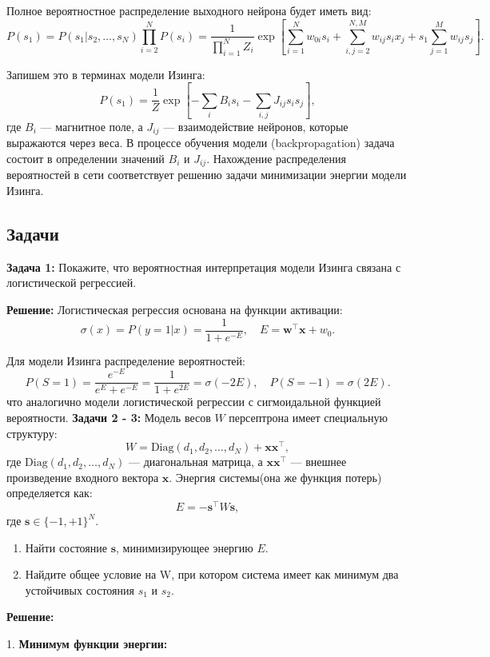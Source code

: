 \begin{description}
Полное вероятностное распределение выходного нейрона будет иметь вид:
\[
P(s_1) = P(s_1 | s_2, \dots, s_N) \prod_{i=2}^N P(s_i) = \frac{1}{\prod_{i=1}^N Z_i} \exp\left[ \sum_{i=1}^N w_{0i} s_i + \sum_{i,j=2}^{N,M} w_{ij} s_i x_j + s_1 \sum_{j=1}^M w_{ij} s_j \right].
\]

Запишем это в терминах модели Изинга:
\[
P(s_1) = \frac{1}{Z} \exp\left[-\sum_i B_i s_i - \sum_{i,j} J_{ij} s_i s_j \right],
\]
где $B_i$ — магнитное поле, а $J_{ij}$ — взаимодействие нейронов, которые выражаются через веса. В процессе обучения модели (backpropagation) задача состоит в определении значений $B_i$ и $J_{ij}$.
Нахождение распределения вероятностей в сети соответствует решению задачи минимизации энергии модели Изинга.

\subsection{Задачи}
\textbf{Задача 1:} Покажите, что вероятностная интерпретация модели Изинга связана с логистической регрессией.

\textbf{Решение:}
Логистическая регрессия основана на функции активации:
\[
\sigma(x) = P(y=1 | x) = \frac{1}{1 + e^{-E}}, \quad E = \mathbf{w}^\top \mathbf{x} + w_0.
\]

Для модели Изинга распределение вероятностей:
\[
P(S = 1) = \frac{e^{-E}}{e^{E} + e^{-E}} = \frac{1}{1+ e^{2E}} =  \sigma(-2E),\quad P(S = -1) = \sigma(2E).
\]
что аналогично модели логистической регрессии с сигмоидальной функцией вероятности.
\textbf{Задачи 2 - 3:}  
Модель весов \( W \) персептрона имеет специальную структуру:
\[
W = \text{Diag}(d_1, d_2, \dots, d_N) + \mathbf{x} \mathbf{x}^\top,
\]
где \( \text{Diag}(d_1, d_2, \dots, d_N) \) — диагональная матрица, а \( \mathbf{x} \mathbf{x}^\top \) — внешнее произведение входного вектора \( \mathbf{x} \). Энергия системы(она же функция потерь) определяется как:
\[
E = -\mathbf{s}^\top W \mathbf{s},
\]
где \( \mathbf{s} \in \{-1, +1\}^N \).

\begin{enumerate}
    \item Найти состояние \( \mathbf{s} \), минимизирующее энергию \( E \).
    \item Найдите общее условие на W, при котором система имеет как минимум два устойчивых состояния $s_1$ и $s_2$. 
\end{enumerate}

\textbf{Решение:}

1. \textbf{Минимум функции энергии:}


\end{description}
